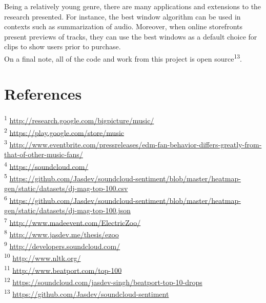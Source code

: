 \documentclass[12pt]{dalcsthesis}
\begin{document}
Being a relatively young genre, there are many applications and extensions to the research presented. For instance, the best window algorithm can be used in contexts such as summarization of audio. Moreover, when online storefronts present previews of tracks, they can use the best windows as a default choice for clips to show users prior to purchase. \\

On a final note, all of the code and work from this project is open source\textsuperscript{13}.

\chapter{References}

\textsuperscript{1} \url{http://research.google.com/bigpicture/music/} \\
\textsuperscript{2} \url{https://play.google.com/store/music} \\
\textsuperscript{3} \url{http://www.eventbrite.com/pressreleases/edm-fan-behavior-differs-greatly-from-that-of-other-music-fans/} \\
\textsuperscript{4} \url{https://soundcloud.com/} \\
\textsuperscript{5} \url{https://github.com/Jasdev/soundcloud-sentiment/blob/master/heatmap-gen/static/datasets/dj-mag-top-100.csv} \\
\textsuperscript{6} \url{https://github.com/Jasdev/soundcloud-sentiment/blob/master/heatmap-gen/static/datasets/dj-mag-top-100.json} \\
\textsuperscript{7} \url{http://www.madeevent.com/ElectricZoo/} \\
\textsuperscript{8} \url{http://www.jasdev.me/thesis/ezoo} \\
\textsuperscript{9} \url{http://developers.soundcloud.com/} \\
\textsuperscript{10} \url{http://www.nltk.org/} \\
\textsuperscript{11} \url{http://www.beatport.com/top-100} \\
\textsuperscript{12} \url{https://soundcloud.com/jasdev-singh/beatport-top-10-drops} \\
\textsuperscript{13} \url{https://github.com/Jasdev/soundcloud-sentiment}



\end{document}
